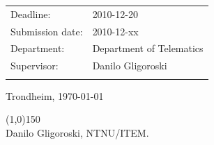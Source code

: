 \documentclass[english,a4paper,12pt,titlepage,twoside]{report}
\begin{document}
\begin{titlepage}
\begin{center}
\begin{tabular}{ p{4cm} p{11cm}}
Deadline: & 2010-12-20 \\
Submission date: & 2010-12-xx \\
Department: & Department of Telematics \\
Supervisor: & Danilo Gligoroski \\\\
\end{tabular}
\vspace{0.5cm}

Trondheim, \today

\vspace{0.4cm}
\line(1,0){150} \\
Danilo Gligoroski, NTNU/ITEM.

\end{center}
\end{titlepage}
\end{document}
